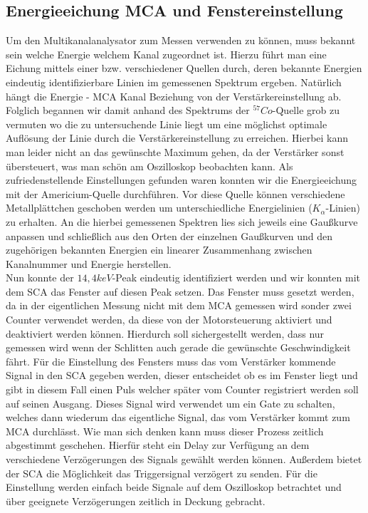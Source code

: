 \documentclass[12pt]{article}
\begin{document}
\subsection{Energieeichung MCA und Fenstereinstellung}
Um den Multikanalanalysator zum Messen verwenden zu können, muss bekannt sein welche Energie welchem Kanal zugeordnet ist. Hierzu führt man eine Eichung mittels einer bzw. verschiedener
Quellen durch, deren bekannte Energien eindeutig identifizierbare Linien im gemessenen Spektrum ergeben. Natürlich hängt die Energie - MCA Kanal Beziehung von der Verstärkereinstellung ab.
Folglich begannen wir damit anhand des Spektrums der $^{57}Co$-Quelle grob zu vermuten wo die zu untersuchende Linie liegt um eine möglichst optimale Auflösung der Linie durch die
Verstärkereinstellung zu erreichen. Hierbei kann man leider nicht an das gewünschte Maximum gehen, da der Verstärker sonst übersteuert, was man schön am Oszilloskop beobachten kann.
Als zufriedenstellende Einstellungen gefunden waren konnten wir die Energieeichung mit der Americium-Quelle durchführen. Vor diese Quelle können verschiedene Metallplättchen geschoben
werden um unterschiedliche Energielinien ($K_\alpha$-Linien) zu erhalten. An die hierbei gemessenen Spektren lies sich jeweils eine Gaußkurve anpassen und schließlich aus den Orten der
einzelnen Gaußkurven und den zugehörigen bekannten Energien ein linearer Zusammenhang zwischen Kanalnummer und Energie herstellen.\\

Nun konnte der $14,4keV$-Peak eindeutig identifiziert werden und wir konnten mit dem SCA das Fenster auf diesen Peak setzen. Das Fenster muss gesetzt werden, da in der eigentlichen
Messung nicht mit dem MCA gemessen wird sonder zwei Counter verwendet werden, da diese von der Motorsteuerung aktiviert und deaktiviert werden können. Hierdurch soll sichergestellt werden,
dass nur gemessen wird wenn der Schlitten auch gerade die gewünschte Geschwindigkeit fährt. Für die Einstellung des Fensters muss das vom Verstärker kommende Signal in den SCA gegeben
werden, dieser entscheidet ob es im Fenster liegt und gibt in diesem Fall einen Puls welcher später vom Counter registriert werden soll auf seinen Ausgang. Dieses Signal wird verwendet
um ein Gate zu schalten, welches dann wiederum das eigentliche Signal, das vom Verstärker kommt zum MCA durchlässt. Wie man sich denken kann muss dieser Prozess zeitlich abgestimmt
geschehen. Hierfür steht ein Delay zur Verfügung an dem verschiedene Verzögerungen des Signals gewählt werden können. Außerdem bietet der SCA die Möglichkeit das Triggersignal verzögert
zu senden. Für die Einstellung werden einfach beide Signale auf dem Oszilloskop betrachtet und über geeignete Verzögerungen zeitlich in Deckung gebracht.\\
\end{document}
